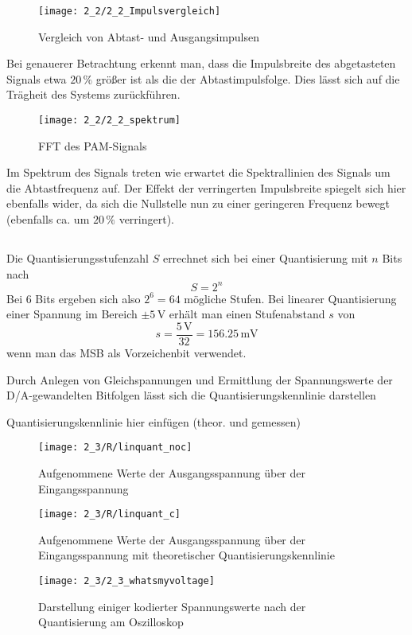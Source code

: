 \documentclass[a4paper, 12pt]{article}
\begin{document}
\begin{figure}[H]
	\texttt{[image: 2\_2/2\_2\_Impulsvergleich]}
  \caption{Vergleich von Abtast- und Ausgangsimpulsen} 
\end{figure}

Bei genauerer Betrachtung erkennt man, dass die Impulsbreite des abgetasteten
Signals etwa $20 \, \si{\percent}$ größer ist als die der Abtastimpulsfolge.
Dies lässt sich auf die Trägheit des Systems zurückführen.

\begin{figure}[H]
	\texttt{[image: 2\_2/2\_2\_spektrum]}
  \caption{FFT des PAM-Signals}
\end{figure}

Im Spektrum des Signals treten wie erwartet die Spektrallinien des Signals um
die Abtastfrequenz auf. 
Der Effekt der verringerten Impulsbreite spiegelt sich hier ebenfalls
wider, da sich die Nullstelle nun zu einer geringeren Frequenz bewegt (ebenfalls
ca. um $20 \, \si{\percent}$ verringert). 

\subsection{}
Die Quantisierungsstufenzahl $S$ errechnet sich bei einer Quantisierung mit $n$
Bits nach
\[ S = 2^n\]
Bei $6$ Bits ergeben sich also $2^6=64$ mögliche Stufen. Bei linearer
Quantisierung einer Spannung im Bereich $\pm 5 \, \si{\volt}$ erhält man einen
Stufenabstand $s$ von
\[ s = \frac{5 \, \si{\volt}}{32} =  156.25 \, \si{\milli\volt} \]
wenn man das MSB als Vorzeichenbit verwendet.

Durch Anlegen von Gleichspannungen und Ermittlung der Spannungswerte der
D/A-gewandelten Bitfolgen lässt sich die Quantisierungskennlinie darstellen

Quantisierungskennlinie hier einfügen (theor. und gemessen)
\begin{figure}[H]
	\texttt{[image: 2\_3/R/linquant\_noc]}
  \caption{Aufgenommene Werte der Ausgangsspannung über der Eingangsspannung}
\end{figure}

\begin{figure}[H]
	\texttt{[image: 2\_3/R/linquant\_c]}
  \caption{Aufgenommene Werte der Ausgangsspannung über der Eingangsspannung mit
  theoretischer Quantisierungskennlinie}
\end{figure}

\begin{figure}[H]
	\texttt{[image: 2\_3/2\_3\_whatsmyvoltage]}
  \caption{Darstellung einiger kodierter Spannungswerte nach der Quantisierung
    am Oszilloskop}
\end{figure}
\end{document}
